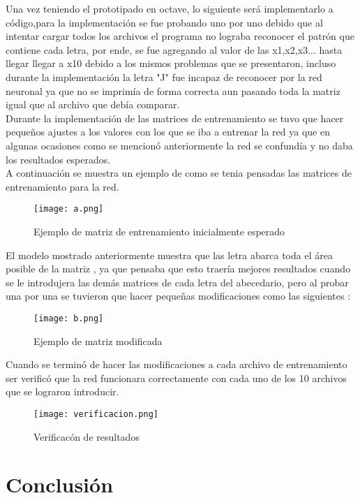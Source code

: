 \documentclass[10pt]{article}         %
\begin{document}
Una vez teniendo el prototipado en octave, lo siguiente será implementarlo a código,para la implementación se fue probando uno por uno debido que al intentar cargar todos los archivos el programa no lograba reconocer el patrón que contiene cada letra, por ende, se fue agregando al valor de las x1,x2,x3... hasta llegar llegar a x10 debido a los mismos problemas que se presentaron, incluso durante la implementación la letra "J" fue incapaz de reconocer por la red neuronal ya que no se imprimía de forma correcta aun pasando toda la matriz igual que al archivo que debía comparar.
\\

Durante la implementación de las matrices de entrenamiento se tuvo que hacer pequeños ajustes a los valores con los que se iba a entrenar la red ya que en algunas ocasiones como se mencionó anteriormente la red se confundía y no daba los resultados esperados.
\\
A continuación se muestra un ejemplo de como se tenia pensadas las matrices de entrenamiento para la red.

\begin{figure}[htb]
\centering
\texttt{[image: a.png]}
\caption{Ejemplo de matriz de entrenamiento inicialmente esperado}
\label{fig:tigre}
\end{figure}

El modelo mostrado anteriormente muestra que las letra abarca toda el área posible de la matriz , ya que pensaba que esto traería mejores resultados cuando se le introdujera las demás matrices de cada letra del abecedario, pero al probar una por una se tuvieron que hacer pequeñas modificaciones como las siguientes :
\\
\begin{figure}[htb]
\centering
\texttt{[image: b.png]}
\caption{Ejemplo de matriz modificada}
\label{fig:tigre}
\end{figure}

Cuando se terminó de hacer las modificaciones a cada archivo de entrenamiento ser verificó que la red funcionara correctamente con cada uno de los 10 archivos que se lograron introducir.
\\
\begin{figure}[htb]
\centering
\texttt{[image: verificacion.png]}
\caption{Verificacón de resultados}
\label{fig:tigre}
\end{figure}



\section{Conclusión}
\end{document}
